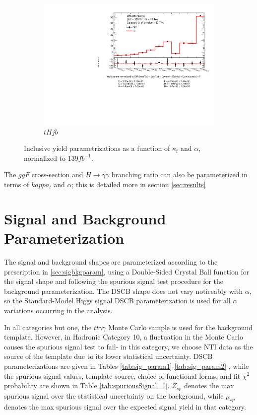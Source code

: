 \begin{figure}[htp]
\begin{subfigure}[b]{0.3\textwidth}
         \includegraphics[width=\textwidth]{figures/tthcp_results/yield_tHjb_0.pdf}
         \caption{$tHjb$}
         \label{fig:tHjbYield}
     \end{subfigure}
     \hfill
  \label{fig:YieldParams}
  \caption{Inclusive yield parametrizations as a function of $\kappa_{t}$ and $\alpha$, normalized to $139 fb^{-1}$.}  
\end{figure}


The $ggF$ cross-section and $H \rightarrow \gamma \gamma$ branching ratio can also be parameterized in terms of $kappa_{t}$ and $\alpha$; this is detailed more in section \ref{sec:results}

\section{Signal and Background Parameterization}

The signal and background shapes are parameterized according to the prescription in \ref{sec:sigbkgparam}, using a Double-Sided Crystal Ball function for the signal shape and following the spurious signal test procedure for the background parameterization. The DSCB shape does not vary noticeably with $\alpha$, so the Standard-Model Higgs signal DSCB parameterization is used for all $\alpha$ variations occurring in the analysis.

In all categories but one, the $tt\gamma\gamma$ Monte Carlo sample is used for the background template. However, in Hadronic Category 10, a fluctuation in the Monte Carlo causes the spurious signal test to fail- in this category, we choose NTI data as the source of the template due to its lower statistical uncertainty. DSCB parameterizations are given in Tables \ref{tab:sig_param1}-\ref{tab:sig_param2} , while the spurious signal values, template source, choice of functional forms, and fit $\chi^{2}$ probability are shown in Table \ref{tab:spuriousSignal_1}. $Z_{sp}$ denotes the max spurious signal over the statistical uncertainty on the background, while $\mu_{sp}$ denotes the max spurious signal over the expected signal yield in that category.

